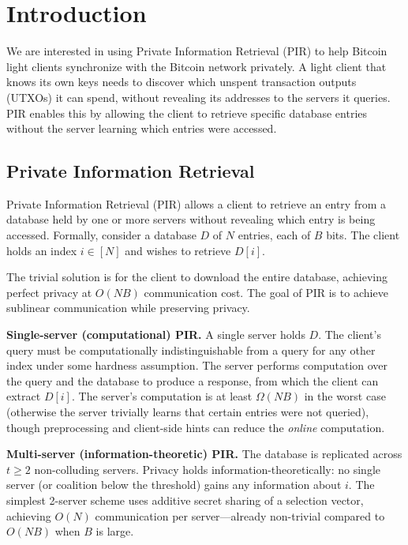 \section{Introduction}

We are interested in using Private Information Retrieval (PIR) to help Bitcoin light clients synchronize with the Bitcoin network privately. A light client that knows its own keys needs to discover which unspent transaction outputs (UTXOs) it can spend, without revealing its addresses to the servers it queries. PIR enables this by allowing the client to retrieve specific database entries without the server learning which entries were accessed.

\subsection{Private Information Retrieval}

Private Information Retrieval (PIR) allows a client to retrieve an entry from a database held by one or more servers without revealing which entry is being accessed. Formally, consider a database $D$ of $N$ entries, each of $B$ bits. The client holds an index $i \in [N]$ and wishes to retrieve $D[i]$.

The trivial solution is for the client to download the entire database, achieving perfect privacy at $O(NB)$ communication cost. The goal of PIR is to achieve sublinear communication while preserving privacy.

\textbf{Single-server (computational) PIR.} A single server holds $D$. The client's query must be computationally indistinguishable from a query for any other index under some hardness assumption. The server performs computation over the query and the database to produce a response, from which the client can extract $D[i]$. The server's computation is at least $\Omega(NB)$ in the worst case (otherwise the server trivially learns that certain entries were not queried), though preprocessing and client-side hints can reduce the \emph{online} computation.

\textbf{Multi-server (information-theoretic) PIR.} The database is replicated across $t \geq 2$ non-colluding servers. Privacy holds information-theoretically: no single server (or coalition below the threshold) gains any information about $i$. The simplest 2-server scheme uses additive secret sharing of a selection vector, achieving $O(N)$ communication per server---already non-trivial compared to $O(NB)$ when $B$ is large.

